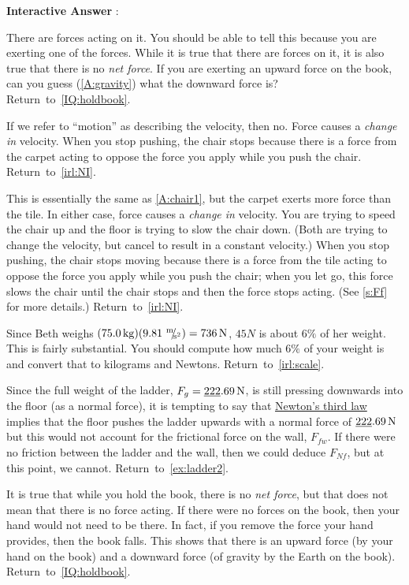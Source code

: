 \documentclass[11pt,letter,openany,makeidx]{book}
\newcommand{\return}[1]{{} \hfill \mbox{Return to \ref{#1}.}}
\newcommand{\autoreturn}[1]{{} \hfill \mbox{Return to \autoref{#1}.}}
\newcounter{AtIQ}
\renewcommand{\theAtIQ}{Answer \arabic{AtIQ}}
\newenvironment{AIQ}{\begin{list}{\textbf{Interactive \theAtIQ}:}{\usecounter{AtIQ} \leftmargin 12pt}}{\end{list}}
\newcommand{\studentB}{Beth}        \newcommand{\massB}{\mbox{$75.0\unit{kg}$}}
\begin{document}
\begin{AIQ}
\item\label{A:hbf} There are forces acting on it.  You should be able to tell this because you are exerting one of the forces. While it is true that there are forces on it, it is also true that there is no \textit{net force}.  If you are exerting an upward force on the book, can you guess (\ref{A:gravity}) what the downward force is?   \return{IQ:holdbook}
\item\label{A:chair1} If we refer to ``motion'' as describing the velocity, then no. Force causes a \textit{change in} velocity. When you stop pushing, the chair stops because there is a force from the carpet acting to oppose the force you apply while you push the chair. \autoreturn{irl:NI}
\item\label{A:chair2} This is essentially the same as \ref{A:chair1}, but the carpet exerts more force than the tile.  In either case, force causes a \textit{change in} velocity. You are trying to speed the chair up and the floor is trying to slow the chair down.  (Both are trying to change the velocity, but cancel to result in a constant velocity.)  When you stop pushing, the chair stops moving because there is a force from the tile acting to oppose the force you apply while you push the chair; when you let go, this force slows the chair until the chair stops and then the force stops acting. (See \autoref{s:Ff} for more details.) \autoreturn{irl:NI}
\item\label{A:weight.loss} Since \studentB\index{\studentB} weighs $(\massB)(9.81\unitfrac{m}{s^2})=736\unit{N}$, $45\unit{N}$ is about $6\%$ of her weight.  This is fairly substantial.  You should compute how much $6\%$ of your weight is and convert that to kilograms and Newtons.  \autoreturn{irl:scale}
\item \label{A:ladderNf} Since the full weight of the ladder, $F_g = \underline{222}{.69}\,\mathrm{N}$, is still pressing downwards into the floor (as a normal force), it is tempting to say that \hyperref[ss:NIII]{Newton's third law} implies that the floor pushes the ladder upwards with a normal force of $\underline{222}{.69}\,\mathrm{N}$ but this would not account for the frictional force on the wall, $F_{fw}$.  If there were no friction between the ladder and the wall, then we could deduce $F_{Nf}$, but at this point, we cannot. \autoreturn{ex:ladder2}
\item\label{A:hbnof}  It is true that while you hold the book, there is no \textit{net force}, but that does not mean that there is no force acting.  If there were no forces on the book, then your hand would not need to be there.  In fact, if you remove the force your hand provides, then the book falls. This shows that there is an upward force (by your hand on the book) and a downward force (of gravity by the Earth on the book).  \return{IQ:holdbook}

\end{AIQ}
\end{document}
